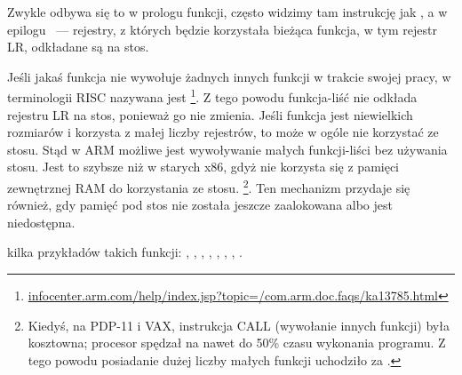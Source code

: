 
Zwykle odbywa się to w prologu funkcji, często widzimy tam instrukcję jak , a w epilogu
~--- rejestry, z których będzie korzystała bieżąca funkcja, w tym rejestr \ac{LR}, odkładane są na stos.

Jeśli jakaś funkcja nie wywołuje żadnych innych funkcji w trakcie swojej pracy, w terminologii \ac{RISC} nazywana jest
\emph{}\footnote{\href{http://go.yurichev.com/17064}{infocenter.arm.com/help/index.jsp?topic=/com.arm.doc.faqs/ka13785.html}}.
Z tego powodu funkcja-liść nie odkłada rejestru \ac{LR} na stos, ponieważ go nie zmienia.
Jeśli funkcja jest niewielkich rozmiarów i korzysta z małej liczby rejestrów, to może w ogóle nie korzystać ze stosu.
Stąd w ARM możliwe jest wywoływanie małych funkcji-liści bez używania stosu.
Jest to szybsze niż w starych x86, gdyż nie korzysta się z pamięci zewnętrznej RAM do korzystania ze stosu.
\footnote{Kiedyś, na PDP-11 i VAX, instrukcja CALL (wywołanie innych funkcji) była kosztowna; procesor spędzał na \CALL nawet do 50\% czasu wykonania programu. Z tego powodu posiadanie dużej liczby małych funkcji uchodziło za 
.}.
Ten mechanizm przydaje się również, gdy pamięć pod stos nie została jeszcze zaalokowana albo jest niedostępna.

kilka przykładów takich funkcji:
, , 
, , ,
, , .


